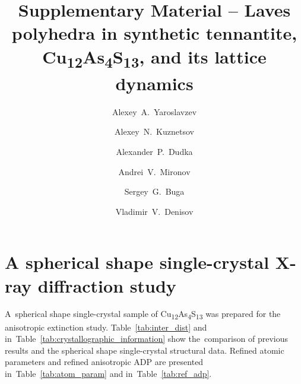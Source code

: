 \documentclass[preprint,review,12pt]{elsarticle}
\begin{document}
\begin{frontmatter}



\title{Supplementary Material \--- Laves polyhedra in synthetic tennantite, Cu\textsubscript{12}As\textsubscript{4}S\textsubscript{13}, and its lattice dynamics}

\author[TISNCM]{Alexey~A.~Yaroslavzev}
\author[MSU,ICRAS]{Alexey~N.~Kuznetsov}
\author[SIC]{Alexander~P.~Dudka}
\author[MSU]{Andrei~V.~Mironov}
\author[TISNCM]{Sergey~G.~Buga}
\author[TISNCM]{Vladimir~V.~Denisov}

\address[TISNCM]{Technological Institute for Superhard and Novel Carbon Materials, 108840, Troitsk, Moscow, Russia}
\address[MSU]{Department of Chemistry, Lomonosov Moscow State University, 119991, Moscow, Russia}
\address[ICRAS]{Kurnakov Institute of General and Inorganic Chemistry RAS, 119991, Moscow, Russia}
\address[SIC]{Shubnikov Institute of Crystallography of Federal Scientific Research Centre “Crystallography and Photonics” of Russian Academy of Sciences, Leninskiy Prospekt 59, 119333, Moscow, Russia}


\end{frontmatter}


\section{A spherical shape single-crystal X-ray diffraction study}\label{sec:level1}

A~spherical shape single-crystal sample of Cu\textsubscript{12}As\textsubscript{4}S\textsubscript{13}  was prepared for the anisotropic extinction study.
Table~\ref{tab:inter_dist} and in~Table~\ref{tab:crystallographic_information} show the~comparison of previous results\cite{yaroslavzev2019} and the spherical shape single-crystal structural data. Refined atomic parameters and refined anisotropic ADP are presented in~Table~\ref{tab:atom_param} and in~Table~\ref{tab:ref_adp}.
\end{document}
